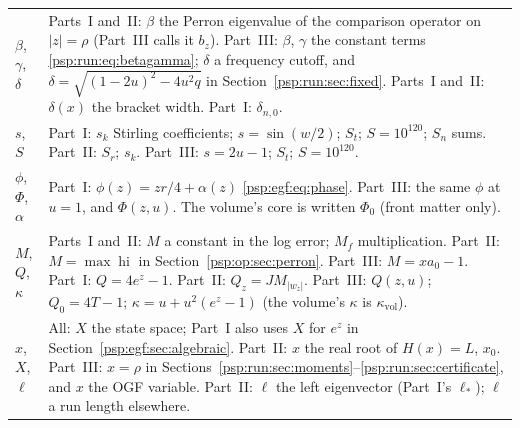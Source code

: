 \documentclass[11pt,letterpaper]{article}
\numberwithin{equation}{section}
\theoremstyle{remark}\newtheorem{remark}[theorem]{Remark}
\newcommand{\hi}{\operatorname{hi}}
\newcommand{\vol}{\mathrm{vol}}
\begin{document}
\begin{longtable}{@{}>{\raggedright\arraybackslash}p{} >{\raggedright\arraybackslash}p{}@{}}
$\beta$, $\gamma$, $\delta$ & Parts~I and~II: $\beta$ the Perron eigenvalue of the comparison operator on $|z|=\rho$ (Part~III calls it $b_z$). Part~III: $\beta$, $\gamma$ the constant terms \eqref{psp:run:eq:betagamma}; $\delta$ a frequency cutoff, and $\delta=\sqrt{(1-2u)^2-4u^2q}$ in Section~\ref{psp:run:sec:fixed}. Parts~I and~II: $\delta(x)$ the bracket width. Part~I: $\delta_{n,0}$.\\
$s$, $S$ & Part~I: $s_k$ Stirling coefficients; $s=\sin(w/2)$; $S_t$; $S=10^{120}$; $S_n$ sums. Part~II: $S_r$; $s_k$. Part~III: $s=2u-1$; $S_t$; $S=10^{120}$.\\
$\phi$, $\Phi$, $\alpha$ & Part~I: $\phi(z)=zr/4+\alpha(z)$ \eqref{psp:egf:eq:phase}. Part~III: the same $\phi$ at $u=1$, and $\Phi(z,u)$. The volume's core is written $\Phi_0$ (front matter only).\\
$M$, $Q$, $\kappa$ & Parts~I and~II: $M$ a constant in the log error; $M_f$ multiplication. Part~II: $M=\max\hi$ in Section~\ref{psp:op:sec:perron}. Part~III: $M=xa_0-1$. Part~I: $Q=4e^z-1$. Part~II: $Q_z=JM_{|w_z|}$. Part~III: $Q(z,u)$; $Q_0=4T-1$; $\kappa=u+u^2(e^z-1)$ (the volume's $\kappa$ is $\kappa_\vol$).\\
$x$, $X$, $\ell$ & All: $X$ the state space; Part~I also uses $X$ for $e^z$ in Section~\ref{psp:egf:sec:algebraic}. Part~II: $x$ the real root of $H(x)=L$, $x_0$. Part~III: $x=\rho$ in Sections~\ref{psp:run:sec:moments}--\ref{psp:run:sec:certificate}, and $x$ the OGF variable. Part~II: $\ell$ the left eigenvector (Part~I's $\ell_*$); $\ell$ a run length elsewhere.\\
\bottomrule
\end{longtable}
\addtocounter{table}{-1}%
\endgroup
\end{document}
